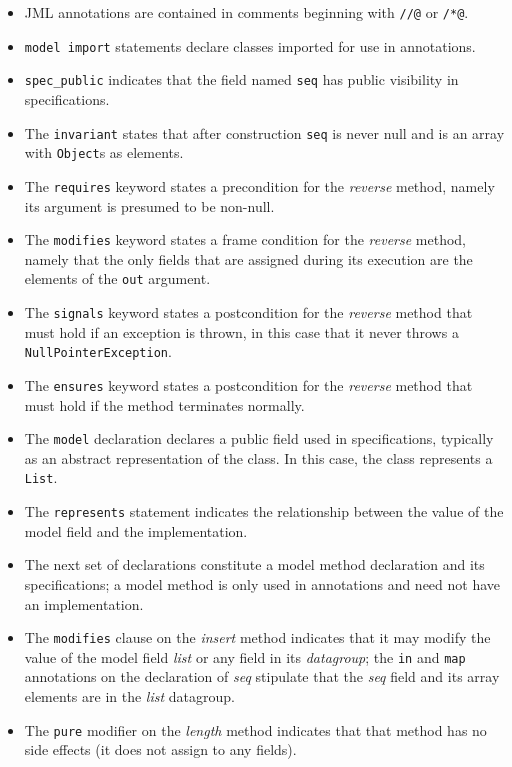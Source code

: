 \documentclass{llncs}
\begin{document}
\begin{itemize}
\item JML annotations are contained in comments beginning with \texttt{//@} or \texttt{/*@}.
\item \texttt{model import} statements declare classes imported for use in annotations.
\item \texttt{spec\_public} indicates that the field named \texttt{seq} has public visibility in specifications.
\item The \texttt{invariant} states that after construction \texttt{seq} is never null and is an array with \texttt{Object}s as elements.
\item The \texttt{requires} keyword states a precondition for the {\em reverse} method, namely 
its argument is presumed to be non-null.
\item The \texttt{modifies} keyword states a frame condition for the {\em reverse} method, namely 
that the only fields that are assigned during its execution are the elements of the \texttt{out} argument.
\item The \texttt{signals} keyword states a postcondition for the {\em reverse} method that must hold if an exception is thrown, in this case 
that it never throws a \texttt{NullPointerException}.
\item The \texttt{ensures} keyword states a postcondition for the {\em reverse} method that must hold if the method terminates normally.
\item The \texttt{model} declaration declares a public field used in specifications, typically as an abstract representation of the class.  In this case, the class represents a \texttt{List}.
\item The \texttt{represents} statement indicates the relationship between the value of the model
field and the implementation.
\item The next set of declarations constitute a model method declaration and its specifications;
a model method is only used in annotations and need not have an implementation.
\item The \texttt{modifies} clause on the {\em insert} method indicates that it may modify the value
of the model field {\em list} or any field in its {\em datagroup}; the \texttt{in} and \texttt{map} annotations on the declaration of
{\em seq} stipulate that the {\em seq} field and its array elements are in the {\em list} datagroup.
\item The \texttt{pure} modifier on the {\em length} method indicates that that method has no
side effects (it does not assign to any fields).
\end{itemize}
\end{document}
